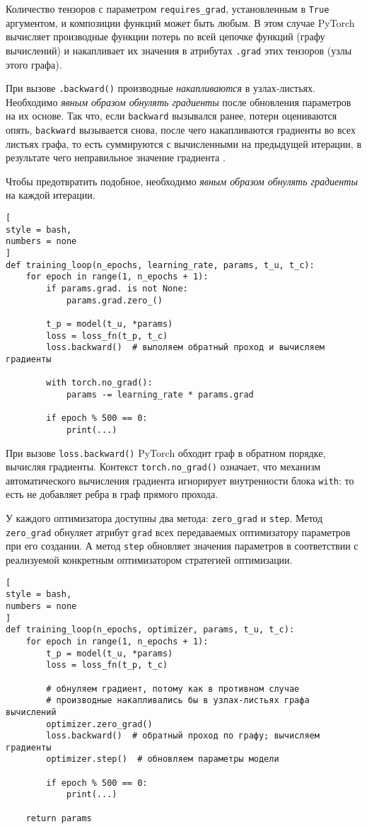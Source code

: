 \documentclass[%
	11pt,
	a4paper,
	utf8,
		]{article}
\begin{document}
Количество тензоров с параметром \verb|requires_grad|, установленным в \verb|True| аргументом, и композиции функций может быть любым. В этом случае PyTorch вычисляет производные функции потерь по всей цепочке функций (графу вычислений) и накапливает их значения в атрибутах \verb|.grad| этих тензоров (узлы этого графа).

При вызове \verb|.backward()| производные \emph{накапливаются} в узлах-листьях. {\color{blue}Необходимо \emph{явным образом обнулять градиенты} после обновления параметров на их основе}. Так что, если \verb|backward| вызывался ранее, потери оцениваются опять, \verb|backward| вызывается снова, после чего накапливаются градиенты во всех листьях графа, то есть суммируются с вычисленными на предыдущей итерации, в результате чего неправильное значение градиента \cite[]{pytorch-2022}.

Чтобы предотвратить подобное, необходимо \emph{явным образом обнулять градиенты} на каждой итерации.

\begin{lstlisting}[
style = bash,
numbers = none
]
def training_loop(n_epochs, learning_rate, params, t_u, t_c):
    for epoch in range(1, n_epochs + 1):
        if params.grad. is not None:
            params.grad.zero_()
            
        t_p = model(t_u, *params)
        loss = loss_fn(t_p, t_c)
        loss.backward()  # выполяем обратный проход и вычисляем градиенты
        
        with torch.no_grad():
            params -= learning_rate * params.grad
            
        if epoch % 500 == 0:
            print(...)
\end{lstlisting}

При вызове \verb|loss.backward()| PyTorch обходит граф в обратном порядке, вычисляя градиенты. Контекст \verb|torch.no_grad()| означает, что механизм автоматического вычисления градиента игнорирует внутренности блока \verb|with|: то есть не добавляет ребра в граф прямого прохода.

У каждого оптимизатора доступны два метода: \verb|zero_grad| и \verb|step|. Метод \verb|zero_grad| обнуляет атрибут \verb|grad| всех передаваемых оптимизатору параметров при его создании. А метод \verb|step| обновляет значения параметров в соответствии с реализуемой конкретным оптимизатором стратегией оптимизации.
\begin{lstlisting}[
style = bash,
numbers = none	
]
def training_loop(n_epochs, optimizer, params, t_u, t_c):
    for epoch in range(1, n_epochs + 1):
        t_p = model(t_u, *params)
        loss = loss_fn(t_p, t_c)
        
        # обнуляем градиент, потому как в противном случае
        # производные накапливались бы в узлах-листьях графа вычислений
        optimizer.zero_grad()
        loss.backward()  # обратный проход по графу; вычисляем градиенты
        optimizer.step()  # обновляем параметры модели
        
        if epoch % 500 == 0:
            print(...)
            
    return params
\end{lstlisting}
\end{document}
